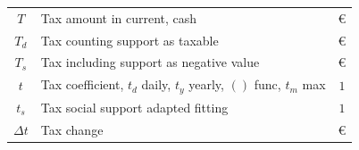\begin{center}
\begin{supertabular}{ c l c }
$ T	$& Tax amount in current, cash			&$ \euro	$\\
$ T_d	$& Tax counting support as taxable		&$ \euro	$\\
$ T_s	$& Tax including support as negative value	&$ \euro	$\\
$t$&Tax coefficient, $t_d$ daily, $t_y$ yearly, $()$ func, $t_m$ max&$ 1$\\
$ t_s	$& Tax social support adapted fitting		&$ 1		$\\
$\Delta t$& Tax change					&$ \euro	$\\
\end{supertabular}
\end{center}
